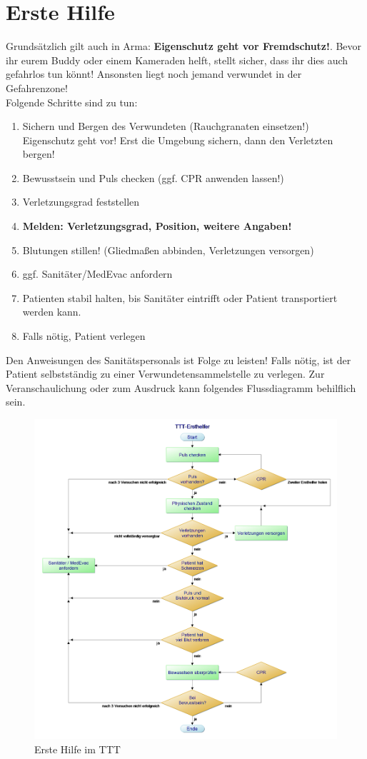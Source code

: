 \pagebreak
\section{Erste Hilfe}
Grundsätzlich gilt auch in Arma: \textbf{Eigenschutz geht vor Fremdschutz!}. Bevor ihr eurem Buddy oder einem Kameraden helft, stellt sicher, dass ihr dies auch gefahrlos tun könnt! Ansonsten liegt noch jemand verwundet in der Gefahrenzone!\\
Folgende Schritte sind zu tun:
\begin{enumerate}
	\item Sichern und Bergen des Verwundeten (Rauchgranaten einsetzen!)\\
			Eigenschutz geht vor! Erst die Umgebung sichern, dann den Verletzten bergen! 
	\item Bewusstsein und Puls checken (ggf. CPR anwenden lassen!)
	\item Verletzungsgrad feststellen
	\item \textbf{Melden: Verletzungsgrad, Position, weitere Angaben!}
	\item Blutungen stillen! (Gliedmaßen abbinden, Verletzungen versorgen)
	\item ggf. Sanitäter/MedEvac anfordern
	\item Patienten stabil halten, bis Sanitäter eintrifft oder Patient transportiert werden kann.
	\item Falls nötig, Patient verlegen
\end{enumerate}
Den Anweisungen des Sanitätspersonals ist Folge zu leisten! Falls nötig, ist der Patient selbstständig zu einer Verwundetensammelstelle zu verlegen.
Zur Veranschaulichung oder zum Ausdruck kann folgendes Flussdiagramm behilflich sein.
\begin{figure}[htbp]
		\centering
			\includegraphics[width=15cm]{./img/grundlagen/ersteHilfe/TTT-Ersthelfer.png}
			\caption{Erste Hilfe im TTT}
\end{figure}
